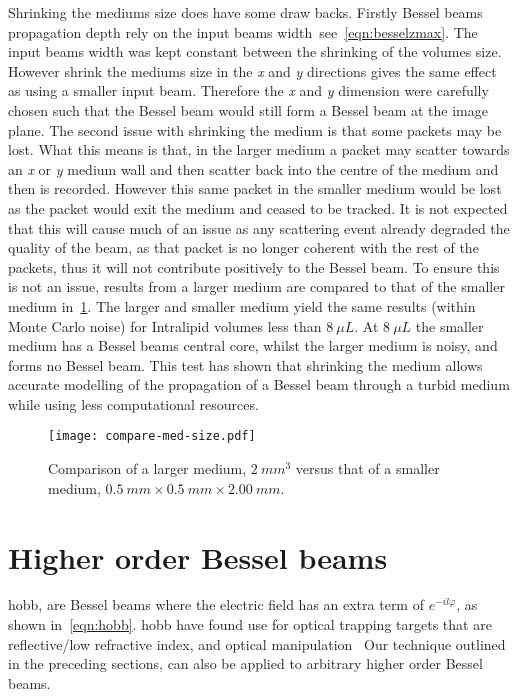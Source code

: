 Shrinking the mediums size does have some draw backs.
Firstly Bessel beams propagation depth rely on the input beams width\ see~\cref{eqn:besselzmax}.
The input beams width was kept constant between the shrinking of the volumes size.
However shrink the mediums size in the \textit{x} and \textit{y} directions gives the same effect as using a smaller input beam.
Therefore the \textit{x} and \textit{y} dimension were carefully chosen such that the Bessel beam would still form a Bessel beam at the image plane.
The second issue with shrinking the medium is that some packets may be lost.
What this means is that, in the larger medium a packet may scatter towards an \textit{x} or \textit{y} medium wall and then scatter back into the centre of the medium and then is recorded.
However this same packet in the smaller medium would be lost as the packet would exit the medium and ceased to be tracked.
It is not expected that this will cause much of an issue as any scattering event already degraded the quality of the beam, as that packet is no longer coherent with the rest of the packets, thus it will not contribute positively to the Bessel beam.
To ensure this is not an issue, results from a larger medium are compared to that of the smaller medium in~\cref{fig:compareBigSmall}.
The larger and smaller medium yield the same results (within Monte Carlo noise) for Intralipid volumes less than $8~\mu L$.
At $8~\mu L$ the smaller medium has a Bessel beams central core, whilst the larger medium is noisy, and forms no Bessel beam.
This test has shown that shrinking the medium allows accurate modelling of the propagation of a Bessel beam through a turbid medium while using less computational resources.

\begin{figure}[!ht]
    \centering
    \texttt{[image: compare-med-size.pdf]}
    \caption{Comparison of a larger medium, $2~mm^3$ versus that of a smaller medium, $0.5~mm \times 0.5~mm \times 2.00~mm$.}
    \label{fig:compareBigSmall}
\end{figure}

\FloatBarrier

\section{Higher order Bessel beams}

\Gls*{hobb}, are Bessel beams where the electric field has an extra term of $e^{-il\varphi}$, as shown in~\cref{eqn:hobb}.
\Gls*{hobb} have found use for optical trapping targets that are reflective/low refractive index, and optical manipulation~\cite{garces2002transfer,garces2003observation}
Our technique outlined in the preceding sections, can also be applied to arbitrary higher order Bessel beams. 

